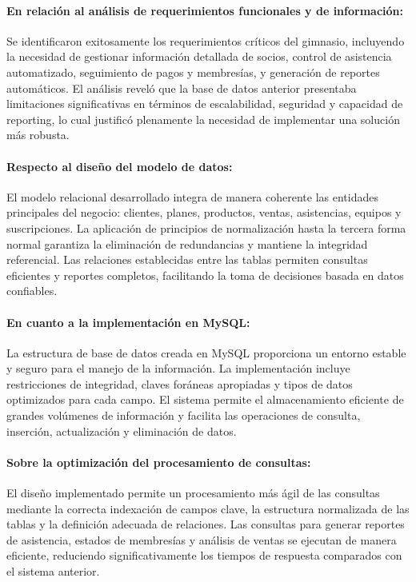 \documentclass[12pt, letterpaper]{article}
\begin{document}
\paragraph{En relación al análisis de requerimientos funcionales y de información:}
Se identificaron exitosamente los requerimientos críticos del gimnasio, incluyendo la necesidad de gestionar información detallada de socios, control de asistencia automatizado, seguimiento de pagos y membresías, y generación de reportes automáticos. El análisis reveló que la base de datos anterior presentaba limitaciones significativas en términos de escalabilidad, seguridad y capacidad de reporting, lo cual justificó plenamente la necesidad de implementar una solución más robusta.
\paragraph{Respecto al diseño del modelo de datos:}
El modelo relacional desarrollado integra de manera coherente las entidades principales del negocio: clientes, planes, productos, ventas, asistencias, equipos y suscripciones. La aplicación de principios de normalización hasta la tercera forma normal garantiza la eliminación de redundancias y mantiene la integridad referencial. Las relaciones establecidas entre las tablas permiten consultas eficientes y reportes completos, facilitando la toma de decisiones basada en datos confiables.
\paragraph{En cuanto a la implementación en MySQL:}
La estructura de base de datos creada en MySQL proporciona un entorno estable y seguro para el manejo de la información. La implementación incluye restricciones de integridad, claves foráneas apropiadas y tipos de datos optimizados para cada campo. El sistema permite el almacenamiento eficiente de grandes volúmenes de información y facilita las operaciones de consulta, inserción, actualización y eliminación de datos.
\paragraph{Sobre la optimización del procesamiento de consultas:}
El diseño implementado permite un procesamiento más ágil de las consultas mediante la correcta indexación de campos clave, la estructura normalizada de las tablas y la definición adecuada de relaciones. Las consultas para generar reportes de asistencia, estados de membresías y análisis de ventas se ejecutan de manera eficiente, reduciendo significativamente los tiempos de respuesta comparados con el sistema anterior.
\end{document}
